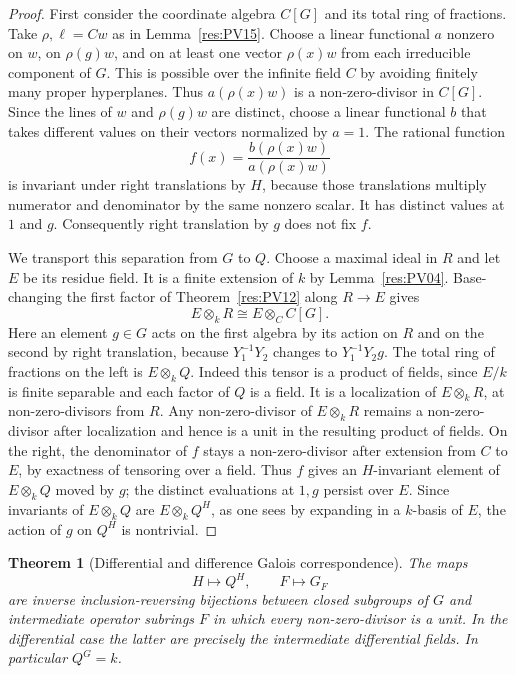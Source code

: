 \documentclass[11pt,oneside,openany]{book}
\newtheorem{theorem}{Theorem}[chapter]
\theoremstyle{definition}
\theoremstyle{remark}
\begin{document}
\begin{proof}
First consider the coordinate algebra \(C[G]\) and its total
ring of fractions. Take \(\rho,\ell=Cw\) as in
Lemma~\ref{res:PV15}. Choose a linear functional \(a\)
nonzero on \(w\), on \(\rho(g)w\), and on at least one vector
\(\rho(x)w\) from each irreducible component of \(G\).
This is possible over the infinite field \(C\) by avoiding
finitely many proper hyperplanes. Thus \(a(\rho(x)w)\)
is a non-zero-divisor in \(C[G]\). Since the lines of
\(w\) and \(\rho(g)w\) are distinct, choose a linear functional
\(b\) that takes different values on their vectors normalized
by \(a=1\). The rational function
\[
 f(x)=\frac{b(\rho(x)w)}{a(\rho(x)w)}
\]
is invariant under right translations by \(H\), because those
translations multiply numerator and denominator by the same
nonzero scalar. It has distinct values at \(1\) and \(g\).
Consequently right translation by \(g\) does not fix \(f\).

We transport this separation from \(G\) to \(Q\). Choose a
maximal ideal in \(R\) and let \(E\) be its residue field.
It is a finite extension of \(k\) by Lemma~\ref{res:PV04}.
Base-changing the first factor of Theorem~\ref{res:PV12}
along \(R\to E\) gives
\[
 E\otimes_k R\cong E\otimes_C C[G].
\]
Here an element \(g\in G\) acts on the first algebra by its
action on \(R\) and on the second by right translation,
because \(Y_1^{-1}Y_2\) changes to \(Y_1^{-1}Y_2g\).
The total ring of fractions on the left is \(E\otimes_k Q\).
Indeed this tensor is a product of fields, since
\(E/k\) is finite separable and each factor of \(Q\) is a field.
It is a localization of \(E\otimes_k R\), at non-zero-divisors
from \(R\). Any non-zero-divisor of \(E\otimes_k R\) remains
a non-zero-divisor after localization and hence is a unit
in the resulting product of fields. On the right, the
denominator of \(f\) stays a non-zero-divisor after extension
from \(C\) to \(E\), by exactness of tensoring over a field.
Thus \(f\) gives an \(H\)-invariant element of \(E\otimes_k Q\)
moved by \(g\); the distinct evaluations at \(1,g\) persist
over \(E\). Since invariants of \(E\otimes_k Q\) are
\(E\otimes_k Q^H\), as one sees by expanding in a \(k\)-basis
of \(E\), the action of \(g\) on \(Q^H\) is nontrivial.
\end{proof}

\begin{theorem}[Differential and difference Galois correspondence]
\label{res:PV17}
The maps
\[
 H\longmapsto Q^H,\qquad
 F\longmapsto G_F
\]
are inverse inclusion-reversing bijections between closed
subgroups of \(G\) and intermediate operator subrings \(F\)
in which every non-zero-divisor is a unit. In the differential
case the latter are precisely the intermediate differential
fields. In particular \(Q^G=k\).
\end{theorem}
\end{document}
